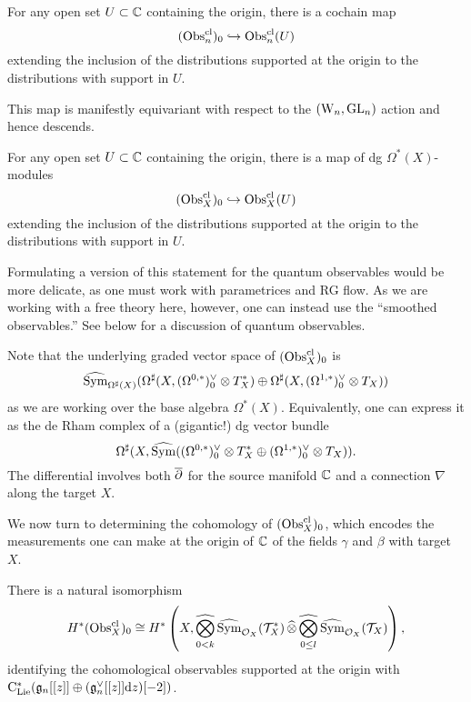 \begin{lemma}
For any open set $U \subset \mathbb C$ containing the origin, there is a cochain map
\[
({\rm Obs}^{\rm cl}_n)_0 \hookrightarrow {\rm Obs}^{\rm cl}_n(U)
\]
extending the inclusion of the distributions supported at the origin to the distributions with support in $U$.
\end{lemma}

This map is manifestly equivariant with respect to the $({{\rm W}_n},{\rm GL}_n)$ action and hence descends.

\begin{cor}
For any open set $U \subset \mathbb C$ containing the origin, there is a map of dg $\Omega^*(X)$-modules
\[
({\rm Obs}^{\rm cl}_X)_0 \hookrightarrow {\rm Obs}^{\rm cl}_X(U)
\]
extending the inclusion of the distributions supported at the origin to the distributions with support in $U$.
\end{cor}

\begin{rmk}
Formulating a version of this statement for the quantum observables would be more delicate,
as one must work with parametrices and RG flow.
As we are working with a free theory here, however, one can instead use the ``smoothed observables.''
See below for a discussion of quantum observables.
\end{rmk}

Note that the underlying graded vector space of $({\rm Obs}^{\rm cl}_X)_0$ is
\[
\widehat{{\rm Sym}}_{\Omega^\sharp(X)}(\Omega^\sharp(X,(\Omega^{0,*})^\vee_0 \otimes T^*_X) \oplus \Omega^\sharp(X,(\Omega^{1,*})^\vee_0 \otimes T_X)) 
\]
as we are working over the base algebra $\Omega^*(X)$.
Equivalently, one can express it as the de Rham complex of a (gigantic!) dg vector bundle 
\[
\Omega^\sharp(X, \widehat{{\rm Sym}}((\Omega^{0,*})^\vee_0 \otimes T^*_X \oplus (\Omega^{1,*})^\vee_0 \otimes T_X)).
\]
The differential involves both $\overline{\partial}$ for the source manifold $\mathbb C$ and a connection $\nabla$ along the target $X$.

We now turn to determining the cohomology of $({\rm Obs}^{\rm cl}_X)_0$, 
which encodes the measurements one can make at the origin of $\mathbb C$ 
of the fields $\gamma$ and $\beta$ with target $X$.

\begin{prop}\label{cohomology of point obs}
There is a natural isomorphism 
\[
H^*({\rm Obs}^{\rm cl}_X)_0 \cong 
H^*\left(X,\underset{{0<k}}{\widehat{\bigotimes}}\,\widehat{{\rm Sym}}_{\mathcal O_X}(\mathcal T^*_X)\, \widehat{\otimes}\, \underset{{0\leq l}}{\widehat{\bigotimes}}\,\widehat{{\rm Sym}}_{\mathcal O_X}(\mathcal T_X)\right),
\]
identifying the cohomological observables supported at the origin with ${\rm C}_{\rm Lie}^*(\mathfrak{g}_n[[z]] \oplus (\mathfrak{g}_n^\vee[[z]]{\rm d} z)[-2])$.
\end{prop}

